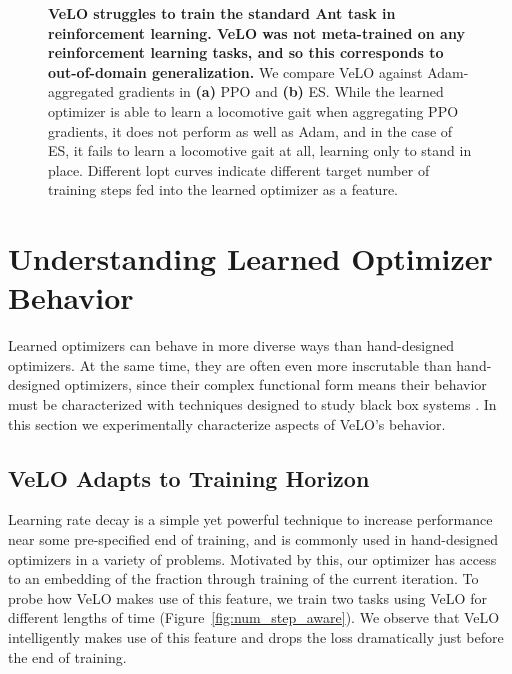 \documentclass[11pt]{article}
\begin{document}
\begin{figure}
\centering    
{}
    \caption{\textbf{VeLO struggles to train the standard Ant task in reinforcement learning. VeLO was not meta-trained on any reinforcement learning tasks, and so this corresponds to out-of-domain generalization.} 
    We compare VeLO against Adam-aggregated gradients in \textbf{(a)} PPO and \textbf{(b)} ES.  While the learned optimizer is able to learn a locomotive gait when aggregating PPO gradients, it does not perform as well as Adam, and in the case of ES, it fails to learn a locomotive gait at all, learning only to stand in place.  Different lopt curves indicate different target number of training steps fed into the learned optimizer as a feature.}
    \label{fig:brax_rl}
\end{figure}

\section{Understanding Learned Optimizer Behavior}

Learned optimizers can behave in more diverse ways than hand-designed optimizers. 
At the same time, they are often even more inscrutable than hand-designed optimizers, since their complex functional form means their behavior must be characterized with techniques designed to study black box systems
\citep{maheswaranathan2020reverse}.
In this section we experimentally characterize aspects of VeLO's behavior.

\subsection{VeLO Adapts to Training Horizon}
Learning rate decay is a simple yet powerful technique to increase performance near some pre-specified end of training, and is commonly used in hand-designed optimizers in a variety of problems.
Motivated by this, our optimizer has access to an embedding of the fraction through training of the current iteration.
To probe how VeLO makes use of this feature, we train two tasks using VeLO for different lengths of time (Figure~\ref{fig:num_step_aware}).
We observe that VeLO intelligently makes use of this feature and drops the loss dramatically just before the end of training.
\end{document}
